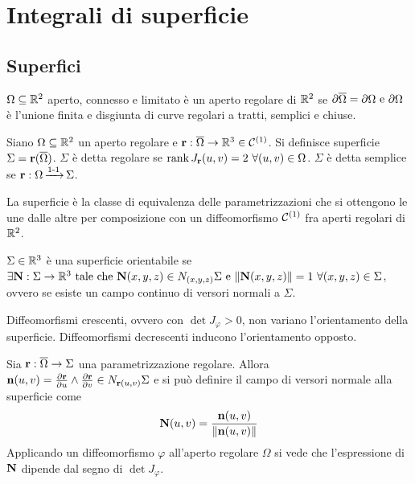 \chapter{Integrali di superficie}

\section{Superfici}

\begin{definition}
	$\Omega \subseteq \mathbb{R}^2$ aperto, connesso e limitato è un aperto regolare di $\mathbb{R}^2$ se $\partial \overline{\Omega}=\partial \Omega \text{ e } \partial \Omega$ è l'unione finita e disgiunta di curve regolari a tratti, semplici e chiuse.
\end{definition}

\begin{definition}
	[Superficie]
	Siano $\Omega \subseteq \mathbb{R}^2$ un aperto regolare e $\vb{r}:\overline{\Omega}\to \mathbb{R}^3 \in \mathcal{C}^{(1)}$. Si definisce superficie $\Sigma=\vb{r}(\overline{\Omega})$.
	$\Sigma$ è detta regolare se $\rank{J_{\vb{r}}(u,v)} = 2 \ \forall (u,v) \in \Omega$.
	$\Sigma$ è detta semplice se $\vb{r}:\Omega \operatorname{\xrightarrow{\operatorname{1-1}}} \Sigma$.
\end{definition}

\begin{remark}
	La superficie è la classe di equivalenza delle parametrizzazioni che si ottengono le une dalle altre per composizione con un diffeomorfismo $\mathcal{C}^{(1)}$ fra aperti regolari di $\mathbb{R}^2$.
\end{remark}

\begin{definition}
	$\Sigma \in \mathbb{R}^3$ è una superficie orientabile se $\exists \vb{N}:\Sigma \to \R^3 \tc \\ \vb{N}(x,y,z)\in N_{(x,y,z)}\Sigma \e \norm{\vb{N}(x,y,z)}=1 \ \forall (x,y,z) \in \Sigma$, ovvero se esiste un campo continuo di versori normali a $\Sigma$.
\end{definition}

\begin{remark}
	Diffeomorfismi crescenti, ovvero con $\det J_\varphi>0$, non variano l'orientamento della superficie. Diffeomorfismi decrescenti inducono l'orientamento opposto.
\end{remark}

Sia $\vb{r}:\overline{\Omega} \to \Sigma$ una parametrizzazione regolare. Allora $\vb{n}(u,v)=\frac{\partial \vb{r}}{\partial u}\wedge\frac{\partial \vb{r}}{\partial v} \in N_{\vb{r}(u,v)}\Sigma$ e si può definire il campo di versori normale alla superficie come
$$
	\vb{N}(u,v)=\frac{\vb{n}(u,v)}{\norm{\vb{n}(u,v)}}
$$
Applicando un diffeomorfismo $\varphi$ all'aperto regolare $\Omega$ si vede che l'espressione di $\vb{N}$ dipende dal segno di $\det J_\varphi$.

